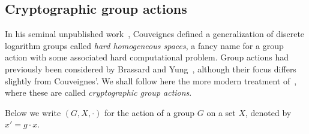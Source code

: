 \documentclass[10pt]{article}
\theoremstyle{plain}
\theoremstyle{definition}
\begin{document}
\begin{prposition}
\section{Cryptographic group actions}
\label{sec:crypt-group-acti}

In his seminal unpublished work~\cite{EPRINT:Couveignes06}, Couveignes
defined a generalization of discrete logarithm groups called
\emph{hard homogeneous spaces}, a fancy name for a group action with
some associated hard computational problem. %
Group actions had previously been considered by Brassard and
Yung~\cite{C:BraYun90}, although their focus differs slightly from
Couveignes'. %
We shall follow here the more modern treatment of~\cite{AC:ADMP20},
where these are called \emph{cryptographic group actions}.

Below we write $(G,X,·)$ for the action of a group $G$ on a set
$X$, denoted by $x' = g·x$.


\end{prposition}
\end{document}
